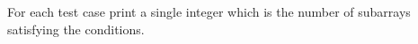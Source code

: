 For each test case print a single integer which is the number of subarrays satisfying the conditions.